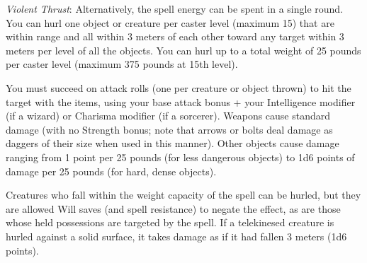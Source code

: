 {	\textit{Violent Thrust}:
	Alternatively, the spell energy can be spent in a single round. You can hurl one object or creature per caster level (maximum 15) that are within range and all within 3 meters of each other toward any target within 3 meters per level of all the objects. You can hurl up to a total weight of 25 pounds per caster level (maximum 375 pounds at 15th level).

	You must succeed on attack rolls (one per creature or object thrown) to hit the target with the items, using your base attack bonus + your Intelligence modifier (if a wizard) or Charisma modifier (if a sorcerer). Weapons cause standard damage (with no Strength bonus; note that arrows or bolts deal damage as daggers of their size when used in this manner). Other objects cause damage ranging from 1 point per 25 pounds (for less dangerous objects) to 1d6 points of damage per 25 pounds (for hard, dense objects).

	Creatures who fall within the weight capacity of the spell can be hurled, but they are allowed Will saves (and spell resistance) to negate the effect, as are those whose held possessions are targeted by the spell. If a telekinesed creature is hurled against a solid surface, it takes damage as if it had fallen 3 meters (1d6 points).

}
